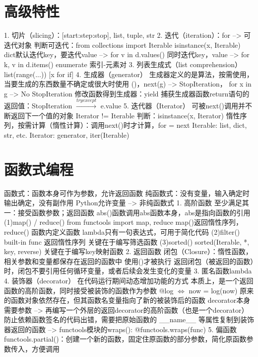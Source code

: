 \documentclass{report}
\begin{document}
\section{高级特性}
1. 切片（slicing）：[start:step:stop], list, tuple, str 
2. 迭代（iteration）：for --> 可迭代对象
   判断可迭代：from collections import Iterable
             isinstance(x, Iterable)
   dict默认迭代key，要迭代value --> for v in d.values()
   同时迭代key，value --> for k, v in d.items() 
   enumerate \Rightarrow 索引-元素对
3. 列表生成式（list comprehension）
   list(range(...))
   [x for if] 
4. 生成器（generator）
   生成器定义的是算法，按需使用，当要生成的东西数量不确定或很大时使用
   ()，next(g) --> StopIteration， for x in g --> No StopIteration 
   修改函数得到生成器：yield
   捕获生成器函数return语句的返回值：StopIteration $\xrightarrow{try except}$ e.value 
5. 迭代器（Iterator）
   可被next()调用并不断返回下一个值的对象
   Iterator != Iterable 
   判断：isinstance(x, Iterator) 
   惰性序列，按需计算（惰性计算）：调用next()时才计算，for = next 
   Iterable: list, dict, str, etc. 
   Iterator: generator, iter(Iterable) 
\section{函数式编程}
函数式：函数本身可作为参数，允许返回函数
纯函数式：没有变量，输入确定时输出确定，没有副作用
Python允许变量 --> 非纯函数式
1. 高阶函数
   至少满足其一：接受函数参数；返回函数
   abs()函数调用abs函数本身，abs是指向函数的引用
    (1)map() / reduce()
        from functools import map, reduce 
        map()返回惰性序列，reduce()
        函数内定义函数
        lambda只有一句表达式，可用于简化代码
    (2)filter()
        built-in func 
        返回惰性序列
        关键在于编写筛选函数
    (3)sorted()
        sorted(Iterable, *, key, reverse)
        关键在于编写key映射函数
2. 返回函数
   闭包（Closure）：惰性函数，相关参数和变量都保存在返回的函数中
   使用()才被执行
   返回闭包（被返回的函数）时，闭包不要引用任何循环变量，或者后续会发生变化的变量
3. 匿名函数lambda
4. 装饰器（decorator）
   在代码运行期间动态增加功能的方式
   本质上，是一个返回函数的高阶函数，同时接受被装饰的函数作为参数
   @log $\Leftrightarrow$ now = log(now) 
   原来的函数对象依然存在，但其函数名变量指向了新的被装饰后的函数
   decorator本身需要参数 --> 再编写一个外层的返回decorator的高阶函数（也是一个decorator）
   防止依赖函数签名的代码出错，需要把原始函数的 __name__ 等属性复制到装饰器返回的函数 --> functools模块的wraps(): @functools.wraps(func)
5. 偏函数
   functools.partial()：创建一个新的函数，固定住原函数的部分参数，简化原函数参数传入，方便调用
\end{document}
